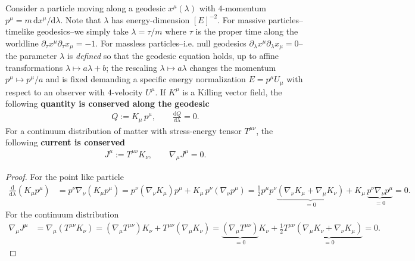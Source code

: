 \documentclass[../geometry_main.tex]{subfiles}
\begin{document}
\begin{mytheorem}
Consider a particle moving along a geodesic $x^\mu(\lambda)$ with $4$-momentum $p^\mu = m\,\mathrm{d}x^\mu/\mathrm{d}\lambda$.
Note that $\lambda$ has energy-dimension $[E]^{-2}$.
For massive particles--timelike geodesics--we simply take $\lambda=\tau/m$ where $\tau$ is the proper time along the worldline  $\partial_\tau x^\mu \partial_\tau x_\mu=-1$.
For massless particles--i.e. null geodesics $\partial_\lambda x^\mu \partial_\lambda x_\mu=0$--the parameter $\lambda$ is \emph{defined} so that the geodesic equation holds, up to affine transformations $\lambda \mapsto a \lambda + b$; the rescaling $\lambda \mapsto a \lambda$ changes the momentum $p^\mu \mapsto p^\mu/a$ and is fixed demanding a specific energy normalization $E=p^\mu U_\mu$ with respect to an observer with $4$-velocity $U^\mu$.
If $K^\mu$ is a Killing vector field, the following \textbf{quantity is conserved along the geodesic}
\begin{align}
    Q := K_\mu \,p^\mu, \qquad \frac{\mathrm{d}Q}{\mathrm{d}\lambda} = 0.
\end{align}
For a continuum distribution of matter with stress-energy tensor $T^{\mu\nu}$, the following \textbf{current is conserved}
\begin{align}
    J^\mu := T^{\mu\nu} K_\nu,\qquad \nabla_\mu J^\mu = 0.
\end{align}
\end{mytheorem}
\begin{proof}
For the point like particle
{\small
\begin{align}
    \frac{\mathrm{d}}{\mathrm{d}\lambda}(K_\mu p^\mu) &= p^\nu \nabla_\nu (K_\mu p^\mu) = p^\nu (\nabla_\nu K_\mu) p^\mu + K_\mu\, p^\nu (\nabla_\nu p^\mu)
     =\tfrac{1}{2}p^\mu p^\nu \underbrace{(\nabla_\nu K_\mu + \nabla_\mu K_\nu)}_{=0} + K_\mu\, \underbrace{p^\nu \nabla_\nu p^\mu}_{=0}= 0.
\end{align}
}
For the continuum distribution
{\small
\begin{align}
    \nabla_\mu J^\mu &= \nabla_\mu (T^{\mu\nu} K_\nu) = (\nabla_\mu T^{\mu\nu}) K_\nu + T^{\mu\nu} (\nabla_\mu K_\nu) = \underbrace{(\nabla_\mu T^{\mu\nu})}_{=0} K_\nu + \tfrac{1}{2} T^{\mu\nu} \underbrace{(\nabla_\mu K_\nu + \nabla_\nu K_\mu)}_{=0} = 0.
\end{align}
}
\end{proof}
\end{document}
